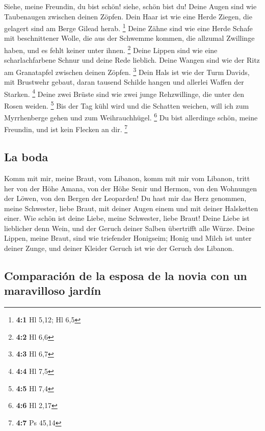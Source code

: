  Siehe, meine Freundin, du bist schön! siehe, schön bist
du! Deine Augen sind wie Taubenaugen zwischen deinen Zöpfen. Dein Haar
ist wie eine Herde Ziegen, die gelagert sind am Berge Gilead herab.
\footnote{\textbf{4:1} Hl 5,12; Hl 6,5}  Deine Zähne sind
wie eine Herde Schafe mit beschnittener Wolle, die aus der Schwemme
kommen, die allzumal Zwillinge haben, und es fehlt keiner unter ihnen.
\footnote{\textbf{4:2} Hl 6,6}  Deine Lippen sind wie eine
scharlachfarbene Schnur und deine Rede lieblich. Deine Wangen sind wie
der Ritz am Granatapfel zwischen deinen Zöpfen. \footnote{\textbf{4:3}
  Hl 6,7}  Dein Hals ist wie der Turm Davids, mit
Brustwehr gebaut, daran tausend Schilde hangen und allerlei Waffen der
Starken. \footnote{\textbf{4:4} Hl 7,5}  Deine zwei Brüste
sind wie zwei junge Rehzwillinge, die unter den Rosen weiden.
\footnote{\textbf{4:5} Hl 7,4}  Bis der Tag kühl wird und
die Schatten weichen, will ich zum Myrrhenberge gehen und zum
Weihrauchhügel. \footnote{\textbf{4:6} Hl 2,17}  Du bist
allerdinge schön, meine Freundin, und ist kein Flecken an dir.
\footnote{\textbf{4:7} Ps 45,14}

\hypertarget{la-boda}{%
\subsection{La boda}\label{la-boda}}

 Komm mit mir, meine Braut, vom Libanon, komm mit mir vom
Libanon, tritt her von der Höhe Amana, von der Höhe Senir und Hermon,
von den Wohnungen der Löwen, von den Bergen der Leoparden!
 Du hast mir das Herz genommen, meine Schwester, liebe
Braut, mit deiner Augen einem und mit deiner Halsketten einer.
 Wie schön ist deine Liebe, meine Schwester, liebe Braut!
Deine Liebe ist lieblicher denn Wein, und der Geruch deiner Salben
übertrifft alle Würze.  Deine Lippen, meine Braut, sind
wie triefender Honigseim; Honig und Milch ist unter deiner Zunge, und
deiner Kleider Geruch ist wie der Geruch des Libanon.

\hypertarget{comparaciuxf3n-de-la-esposa-de-la-novia-con-un-maravilloso-jarduxedn}{%
\subsection{Comparación de la esposa de la novia con un maravilloso
jardín}\label{comparaciuxf3n-de-la-esposa-de-la-novia-con-un-maravilloso-jarduxedn}}

